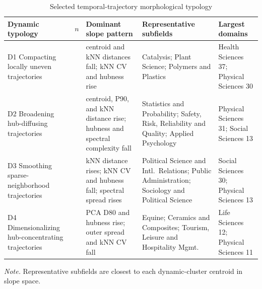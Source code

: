 \begin{table}[H]
\centering
\caption[Dynamic temporal typology summary]{Selected temporal-trajectory morphological typology}
\label{tab:dynamic_typology_summary}
\scriptsize
\begingroup
\setlength{\tabcolsep}{1.2pt}
\begin{tabular}{@{}>{\raggedright\arraybackslash}p{} >{\raggedleft\arraybackslash}p{} >{\raggedright\arraybackslash}p{} >{\raggedright\arraybackslash}p{} >{\raggedright\arraybackslash}p{}@{}}
\hline
\textbf{Dynamic typology} & \textbf{$n$} & \textbf{Dominant slope pattern} & \textbf{Representative subfields} & \textbf{Largest domains} \\
\hline
D1 Compacting locally uneven trajectories & 93 & centroid and kNN distances fall; kNN CV and hubness rise & Catalysis; Plant Science; Polymers and Plastics & Health Sciences 37; Physical Sciences 30 \\
D2 Broadening hub-diffusing trajectories & 58 & centroid, P90, and kNN distance rise; hubness and spectral complexity fall & Statistics and Probability; Safety, Risk, Reliability and Quality; Applied Psychology & Physical Sciences 31; Social Sciences 13 \\
D3 Smoothing sparse-neighborhood trajectories & 54 & kNN distance rises; kNN CV and hubness fall; spectral spread rises & Political Science and Intl.\ Relations; Public Administration; Sociology and Political Science & Social Sciences 30; Physical Sciences 13 \\
D4 Dimensionalizing hub-concentrating trajectories & 35 & PCA D80 and hubness rise; outer spread and kNN CV fall & Equine; Ceramics and Composites; Tourism, Leisure and Hospitality Mgmt. & Life Sciences 12; Physical Sciences 11 \\
\hline
\end{tabular}
\endgroup
\par\vspace{0.15cm}
\footnotesize\textit{Note.} Representative subfields are closest to each dynamic-cluster centroid in slope space.
\end{table}
